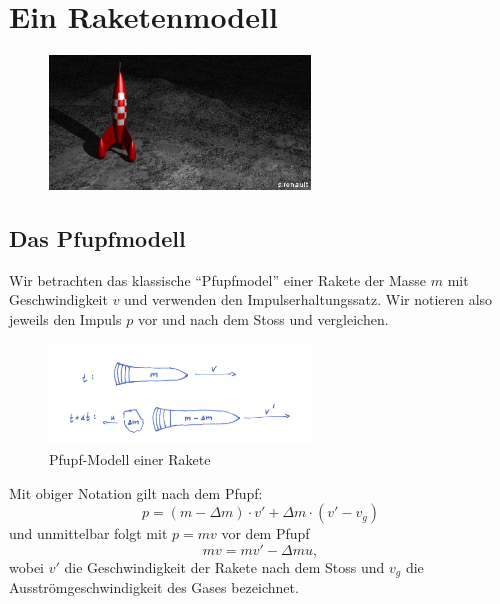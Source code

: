 \documentclass[%
11pt,%
twoside,%
titlepage,%
swissgerman,%
headsepline%
]{scrartcl}
\theoremstyle{definition}
\theoremstyle{plain}
\begin{document}
\clearpage

\section{Ein Raketenmodell}
\begin{figure}
  \begin{center}
    \includegraphics[width=0.618\textwidth]{pictures/raketetim}
  \end{center}
\end{figure}

\subsection{Das Pfupfmodell}

Wir betrachten das klassische \enquote{Pfupfmodel} einer Rakete der Masse $m$ mit Geschwindigkeit $v$ und verwenden den Impulserhaltungssatz. Wir notieren also jeweils den Impuls $p$ vor und nach dem Stoss und vergleichen.

\begin{figure}[h!]
  \begin{center}
    \includegraphics[width=0.618\textwidth]{pictures/raketeimpuls}
  \end{center}
\caption{Pfupf-Modell einer Rakete}
\end{figure}

Mit obiger Notation gilt nach dem Pfupf:
$$p=(m-\Delta m)\cdot v'+\Delta m\cdot(v'-v_g)$$
und unmittelbar folgt mit $p=mv$ vor dem Pfupf
$$mv=mv'-\Delta mu,$$
wobei $v'$ die Geschwindigkeit der Rakete nach dem Stoss und $v_g$ die Ausströmgeschwindigkeit des Gases bezeichnet.
\end{document}
